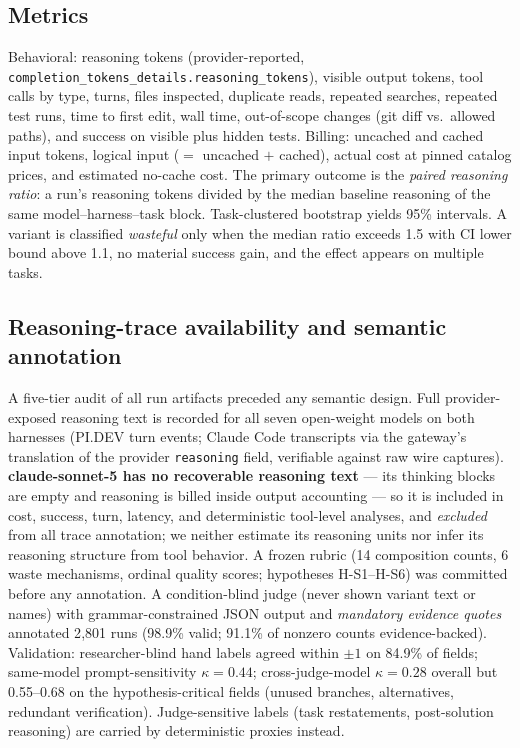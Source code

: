 \documentclass[11pt]{article}
\newcommand{\pidev}{PI.DEV}
\newcommand{\cc}{Claude Code}
\begin{document}


\subsection{Metrics}
Behavioral: reasoning tokens (provider-reported,
\texttt{completion\_tokens\_details.reasoning\_tokens}), visible output
tokens, tool calls by type, turns, files inspected, duplicate reads,
repeated searches, repeated test runs, time to first edit, wall time,
out-of-scope changes (git diff vs.\ allowed paths), and success on visible
plus hidden tests. Billing: uncached and cached input tokens, logical
input ($=$ uncached $+$ cached), actual cost at pinned catalog prices, and
estimated no-cache cost. The primary outcome is the \emph{paired
reasoning ratio}: a run's reasoning tokens divided by the median baseline
reasoning of the same model--harness--task block. Task-clustered bootstrap
yields 95\% intervals. A variant is classified \emph{wasteful} only when
the median ratio exceeds 1.5 with CI lower bound above 1.1, no material
success gain, and the effect appears on multiple tasks.

\subsection{Reasoning-trace availability and semantic annotation}
A five-tier audit of all run artifacts preceded any semantic design. Full
provider-exposed reasoning text is recorded for all seven open-weight
models on both harnesses (\pidev{} turn events; \cc{} transcripts via the
gateway's translation of the provider \texttt{reasoning} field, verifiable
against raw wire captures). \textbf{claude-sonnet-5 has no recoverable
reasoning text} --- its thinking blocks are empty and reasoning is billed
inside output accounting --- so it is included in cost, success, turn,
latency, and deterministic tool-level analyses, and \emph{excluded} from
all trace annotation; we neither estimate its reasoning units nor infer
its reasoning structure from tool behavior. A frozen rubric (14
composition counts, 6 waste mechanisms, ordinal quality scores; hypotheses
H-S1--H-S6) was committed before any annotation. A condition-blind judge
(never shown variant text or names) with grammar-constrained JSON output
and \emph{mandatory evidence quotes} annotated 2{,}801 runs (98.9\% valid;
91.1\% of nonzero counts evidence-backed). Validation: researcher-blind
hand labels agreed within $\pm1$ on 84.9\% of fields; same-model
prompt-sensitivity $\kappa=0.44$; cross-judge-model $\kappa=0.28$ overall
but 0.55--0.68 on the hypothesis-critical fields (unused branches,
alternatives, redundant verification). Judge-sensitive labels
(task restatements, post-solution reasoning) are carried by deterministic
proxies instead.
\end{document}
